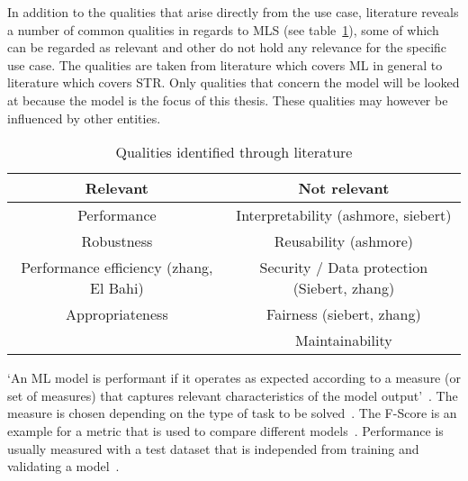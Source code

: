 In addition to the qualities that arise directly from the use case, literature reveals a number of
common qualities in regards to \ac{MLS} (see table~\ref{tb:literatureQualities}), some of which
can be regarded as relevant and other do not hold any relevance for the specific use case.
The qualities are taken from literature which covers \ac{ML} in general to literature
which covers \ac{STR}.
Only qualities that concern the model will be looked at because the model is the focus of this thesis.
These qualities may however be influenced by other entities.


\begin{table}[h]\label{tb:literatureQualities}
    \centering
    \begin{tabular}{c c}
        Relevant                & Not relevant \\
        \hline
        Performance & Interpretability (ashmore, siebert) \\
        Robustness & Reusability (ashmore) \\
        Performance efficiency (zhang, El Bahi)  & Security / Data protection (Siebert, zhang)\\
        Appropriateness & Fairness (siebert, zhang) \\
                                & Maintainability \\
    \end{tabular}
    \caption{Qualities identified through literature}
\end{table}

`An ML model is performant if it operates as expected according to a measure (or set of measures)
that captures relevant characteristics of the model output'~\citep{ashmore_assuring_2021}.
The measure is chosen depending on the type of task to be solved~\citep{siebert_construction_2021}.
The F-Score is an example for a metric that is used to compare different
models~\cite{chen_text_2021, long_scene_2021}.
Performance is usually measured with a test dataset that is independed from training and validating
a model~\cite{goodfellow_deep_2016}.

